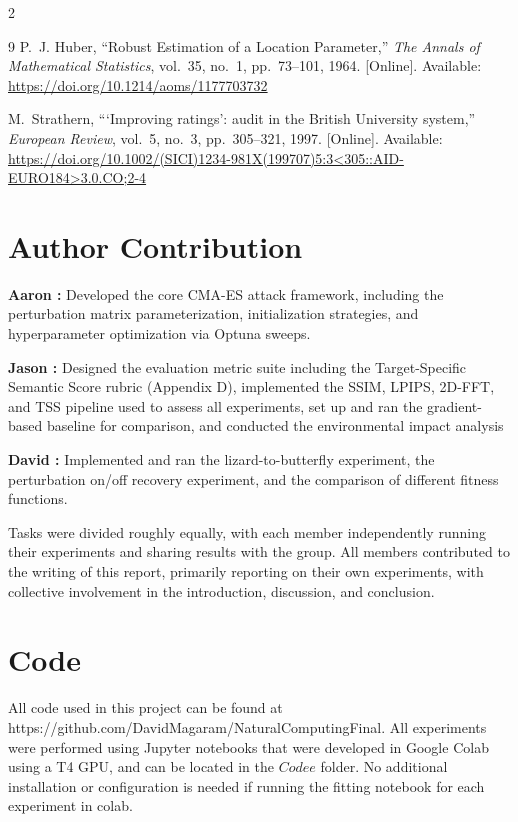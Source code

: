 \documentclass{article}
\begin{document}
\begin{multicols}{2}
\begin{thebibliography}{9}
	P.~J. Huber,
	``Robust Estimation of a Location Parameter,''
	\emph{The Annals of Mathematical Statistics},
	vol.~35, no.~1, pp.~73--101, 1964.
	[Online]. Available: \url{https://doi.org/10.1214/aoms/1177703732}

	M.~Strathern,
	``‘Improving ratings’: audit in the British University system,''
	\emph{European Review},
	vol.~5, no.~3, pp.~305--321, 1997.
	[Online]. Available: \url{https://doi.org/10.1002/(SICI)1234-981X(199707)5:3<305::AID-EURO184>3.0.CO;2-4}


\end{thebibliography}

\section*{Author Contribution}

\textbf{Aaron :} Developed the core CMA-ES attack framework, including the perturbation matrix parameterization, initialization strategies, and hyperparameter optimization via Optuna sweeps.

\textbf{Jason :} Designed the evaluation metric suite including the Target-Specific Semantic Score rubric (Appendix D), implemented the SSIM, LPIPS, 2D-FFT, and TSS pipeline used to assess all experiments, set up and ran the gradient-based baseline for comparison, and conducted the environmental impact analysis

\textbf{David :} Implemented and ran the lizard-to-butterfly experiment, the perturbation on/off recovery experiment, and the comparison of different fitness functions.

Tasks were divided roughly equally, with each member independently running their experiments and sharing results with the group. All members contributed to the writing of this report, primarily reporting on their own experiments, with collective involvement in the introduction, discussion, and conclusion.



\section*{Code}

All code used in this project can be found at https://github.com/DavidMagaram/NaturalComputingFinal. 
All experiments were performed using Jupyter notebooks that were developed in Google Colab using a T4 GPU, and can be located in the $Codee$ folder. 
No additional installation or configuration is needed if running the fitting notebook for each experiment in colab.

\newpage
\end{multicols}
\end{document}
